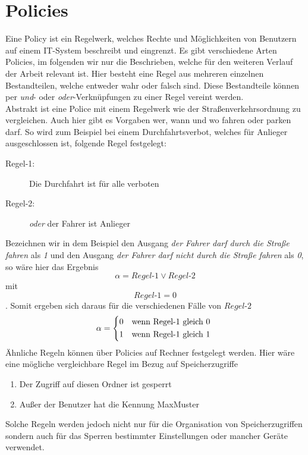 \chapter{Policies} \label{Policies}
Eine Policy ist ein Regelwerk, welches Rechte und Möglichkeiten von Benutzern auf einem IT-System beschreibt und eingrenzt. Es gibt verschiedene Arten Policies, im folgenden wir nur die Beschrieben, welche für den weiteren Verlauf der Arbeit relevant ist. Hier besteht eine Regel aus mehreren einzelnen Bestandteilen, welche entweder wahr oder falsch sind. Diese Bestandteile können per \textit{und}- oder \textit{oder}-Verknüpfungen zu einer Regel vereint werden.\\
Abstrakt ist eine Police mit einem Regelwerk wie der Straßenverkehrsordnung zu vergleichen. Auch hier gibt es Vorgaben wer, wann und wo fahren oder parken darf. So wird zum Beispiel bei einem Durchfahrtsverbot, welches für Anlieger ausgeschlossen ist, folgende Regel festgelegt:
\begin{description}
	\item[Regel-1: ] Die Durchfahrt ist für alle verboten
	\item[Regel-2: ] \textit{oder} der Fahrer ist Anlieger
\end{description}
Bezeichnen wir in dem Beispiel den Ausgang \textit{der Fahrer darf durch die Straße fahren} als \textit{1} und den Ausgang \textit{der Fahrer darf nicht durch die Straße fahren} als \textit{0}, so wäre hier das Ergebnis
\begin{equation*}
	\alpha = Regel\text{-}1 \vee Regel\text{-}2
\end{equation*} mit 
\begin{equation*}
	Regel\text{-}1=0
\end{equation*}. Somit ergeben sich daraus für die verschiedenen Fälle von $Regel$-$2$
\[
	\alpha = 
		\begin{dcases*}
			0 & wenn Regel\text{-}1 gleich 0\\
			1 & wenn Regel\text{-}1 gleich 1
		\end{dcases*}
\]
Ähnliche Regeln können über Policies auf Rechner festgelegt werden. Hier wäre eine mögliche vergleichbare Regel im Bezug auf Speicherzugriffe
\begin{enumerate}
	\item Der Zugriff auf diesen Ordner ist gesperrt
	\item Außer der Benutzer hat die Kennung MaxMuster
\end{enumerate}
Solche Regeln werden jedoch nicht nur für die Organisation von Speicherzugriffen sondern auch für das Sperren bestimmter Einstellungen oder mancher Geräte verwendet.